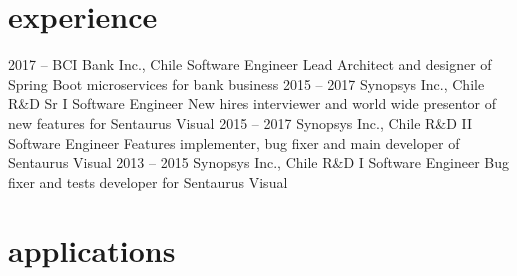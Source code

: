 \documentclass[]{friggeri-cv}
\begin{document}
\section{experience}

\begin{entrylist}
  \entry
    {2017 –}
    {BCI Bank Inc., Chile}
    {Software Engineer Lead}
    {Architect and designer of Spring Boot microservices for bank business}
  \entry
    {2015 – 2017}
    {Synopsys Inc., Chile}
    {R\&D Sr I Software Engineer}
    {New hires interviewer and world wide presentor of new features for Sentaurus Visual}
  \entry
    {2015 – 2017}
    {Synopsys Inc., Chile}
    {R\&D II Software Engineer}
    {Features implementer, bug fixer and main developer of Sentaurus Visual}
  \entry
    {2013 – 2015}
    {Synopsys Inc., Chile}
    {R\&D I Software Engineer}
    {Bug fixer and tests developer for Sentaurus Visual}
\end{entrylist}

\newpage

\section{applications}
\end{document}
